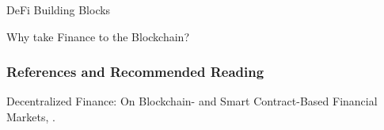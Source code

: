 \documentclass[]{beamer}
\begin{document}


\begin{frame}{DeFi Building Blocks}
	\scalebox{0.7}{
	\begin{tikzpicture}
	
	\end{tikzpicture}
	}
\end{frame}


\begin{frame}{Why take Finance to the Blockchain?}
	
	\scalebox{0.85}{
	\begin{tikzpicture}
		
		
	\end{tikzpicture}
	}
\end{frame}



\begin{frame}%
\frametitle{References and Recommended Reading}
	
	
	Decentralized Finance: On Blockchain- and Smart Contract-Based Financial Markets, \cite{schaer_2021}.
\end{frame}
\end{document}

